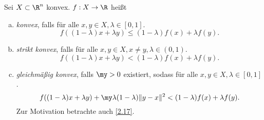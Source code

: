 \begin{df} \label{2.15}
	Sei $X \subset \R^n$ konvex.
	$f: X \to \R$ heißt
	\begin{enumerate}[(a)]
		\item
			\emph{konvex}, falls für alle $x,y \in X, \lambda \in [0,1]$.
			\[
				f((1-\lambda)x + \lambda y)
				\le (1-\lambda) f(x) + \lambda f(y).
			\]
		\item
			\emph{strikt konvex}, falls für alle $x,y \in X, x \neq y, \lambda \in (0,1)$.
			\[
				f((1-\lambda)x + \lambda y)
				< (1-\lambda) f(x) + \lambda f(y).
			\]
		\item
			\emph{gleichmäßig konvex}, falls $\my > 0$ existiert, sodass für alle $x,y \in X, \lambda \in [0,1]$.
			\[
				f((1-\lambda)x + \lambda y) + \my \lambda(1-\lambda) \|y-x\|^2
				< (1-\lambda) f(x) + \lambda f(y).
			\]
			Zur Motivation betrachte auch \ref{2.17}.
	\end{enumerate}
\end{df}

